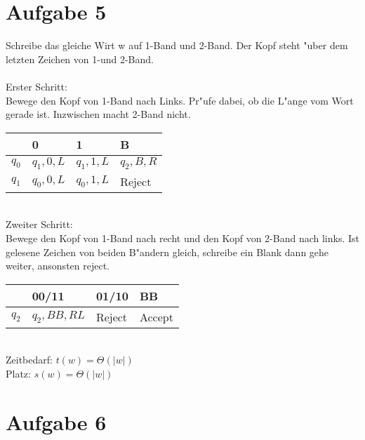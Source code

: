 \documentclass[a4paper,11pt]{scrartcl}
\begin{document}
\section*{Aufgabe 5}

Schreibe das gleiche Wirt w auf 1-Band und 2-Band. Der Kopf steht "uber dem letzten Zeichen von 1-und 2-Band. \\ \ \\
Erster Schritt:\\
Bewege den Kopf von 1-Band nach Links. Pr"ufe dabei, ob die L"ange vom Wort gerade ist. Inzwischen macht 2-Band nicht.


\begin{table}[h!]
	\begin{tabular}{|l|l|l|l|}
		\hline
		& 0         & 1         & B         \\ \hline
		$q_0$ & $q_1,0,L$ & $q_1,1,L$ & $q_2,B,R$ \\ \hline
		$q_1$ & $q_0,0,L$ & $q_0,1,L$ & Reject    \\ \hline
	\end{tabular}
\end{table}
\ \\
Zweiter Schritt:\\
Bewege den Kopf von 1-Band nach recht und den Kopf von 2-Band nach links. Ist gelesene Zeichen von beiden B"andern gleich, schreibe ein Blank dann gehe weiter, ansonsten reject.


\begin{table}[h!]
	\begin{tabular}{|l|l|l|l|}
		\hline
		& 00/11      & 01/10  & BB     \\ \hline
		$q_2$ & $q_2,BB,RL$ & Reject & Accept \\ \hline
	\end{tabular}
\end{table}

\ \\
Zeitbedarf: $t(w)=\Theta (|w|)$\\
Platz: $s(w)=\Theta (|w|)$


\section*{Aufgabe 6}
\end{document}

